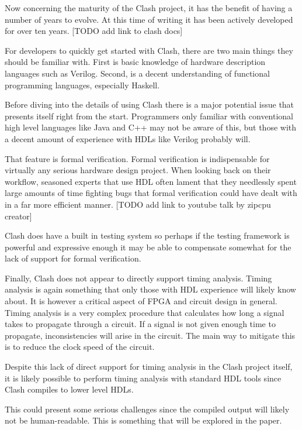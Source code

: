 \documentclass{article}
\begin{document}
\begin{multicols}{2}
    Now concerning the maturity of the Clash project, it has the benefit of having
    a number of years to evolve. At this time of writing it has been actively
    developed for over ten years. [TODO add link to clash docs]

    For developers to quickly get started with Clash, there are two main things they
    should be familiar with. First is basic knowledge of hardware description languages
    such as Verilog. Second, is a decent understanding of functional programming
    languages, especially Haskell.

    Before diving into the details of using Clash there is a major potential issue
    that presents itself right from the start. Programmers only familiar with
    conventional high level languages like Java and C++ may not be aware of this,
    but those with a decent amount of experience with HDLs like Verilog probably will.

    That feature is formal verification. Formal verification is indispensable for
    virtually any serious hardware design project. When looking back on their workflow,
    seasoned experts that use HDL often lament that they needlessly spent
    large amounts of time fighting bugs that formal verification could have dealt with in
    a far more efficient manner. [TODO add link to youtube talk by zipcpu creator]

    Clash does have a built in testing system so perhaps if the testing framework is
    powerful and expressive enough it may be able to compensate somewhat
    for the lack of support for formal verification.

    Finally, Clash does not appear to directly support timing analysis. Timing analysis
    is again something that only those with HDL experience will likely know about. It is
    however a critical aspect of FPGA and circuit design in general. Timing analysis is a
    very complex procedure that calculates how long a signal takes to propagate
    through a circuit. If a signal is not given enough time to propagate, inconsistencies
    will arise in the circuit. The main way to mitigate this is to reduce the clock speed
    of the circuit.

    Despite this lack of direct support for timing analysis in the Clash project itself,
    it is likely possible to perform timing analysis with standard HDL tools since
    Clash compiles to lower level HDLs.

    This could present some serious challenges since the compiled output will
    likely not be human-readable. This is something that will be explored in the paper.
    

\end{multicols}
\end{document}
